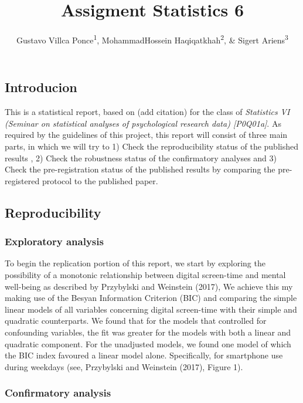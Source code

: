 \documentclass[floatsintext,man]{apa6}
\title{Assigment Statistics 6}
\author{Gustavo Villca Ponce\textsuperscript{1}, MohammadHossein Haqiqatkhah\textsuperscript{2}, \& Sigert Ariens\textsuperscript{3}}
\affiliation{
    \vspace{0.5cm}
          \textsuperscript{1} r0292033\\
          \textsuperscript{2} r0607671\\
          \textsuperscript{3} r0446864  }
\theoremstyle{definition}
\theoremstyle{definition}
\theoremstyle{definition}
\theoremstyle{remark}
\begin{document}
\maketitle

\setcounter{secnumdepth}{0}



\hypertarget{introducion}{%
\subsection{Introducion}\label{introducion}}

This is a statistical report, based on (add citation) for the class of
\emph{Statistics VI (Seminar on statistical analyses of psychological
research data) {[}P0Q01a{]}}. As required by the guidelines of this
project, this report will consist of three main parts, in which we will
try to 1) Check the reproducibility status of the published results , 2)
Check the robustness status of the confirmatory analyses and 3) Check
the pre-registration status of the published results by comparing the
pre-registered protocol to the published paper.

\hypertarget{reproducibility}{%
\subsection{Reproducibility}\label{reproducibility}}

\hypertarget{exploratory-analysis}{%
\subsubsection{Exploratory analysis}\label{exploratory-analysis}}

To begin the replication portion of this report, we start by exploring
the possibility of a monotonic relationship between digital screen-time
and mental well-being as described by Przybylski and Weinstein (2017),
We achieve this my making use of the Besyan Information Criterion (BIC)
and comparing the simple linear models of all variables concerning
digital screen-time with their simple and quadratic counterparts. We
found that for the models that controlled for confounding variables, the
fit was greater for the models with both a linear and quadratic
component. For the unadjusted models, we found one model of which the
BIC index favoured a linear model alone. Specifically, for smartphone
use during weekdays (see, Przybylski and Weinstein (2017), Figure 1).

\hypertarget{confirmatory-analysis}{%
\subsubsection{Confirmatory analysis}\label{confirmatory-analysis}}
\end{document}
